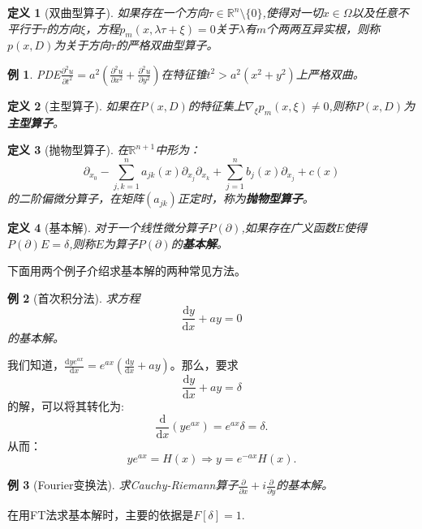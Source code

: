 \documentclass[a4paper]{ctexart}
\newtheorem{Definition}{\hspace{2em}定义}[section]
\newtheorem{Example}{\hspace{2em}例}[section]
\newcommand{\Rn}{\mathbb{R}^{n}}
\newcommand{\dif}{\mathrm{d}}
\newcommand{\difFrac}[2]{\frac{\dif #1}{\dif #2}}
\newcommand{\pdfFrac}[2]{\frac{\partial #1}{\partial #2}}
\begin{document}
\begin{Definition}[双曲型算子]
    如果存在一个方向$\tau\in\Rn\setminus\{0\}$,使得对一切$x\in\Omega$以及任意不平行于$\tau$的方向$\xi$，方程$p_{m}(x,\lambda\tau+\xi)=0$关于$\lambda$有$m$个两两互异实根，则称$p(x,D)$为关于方向$\tau$的严格双曲型算子。
\end{Definition}
\begin{Example}
    PDE$\pdfFrac{^2u}{t^2}=a^2(\pdfFrac{^2u}{x^2}+\pdfFrac{^2u}{y^2})$在特征锥$t^2>a^2(x^2+y^2)$上严格双曲。
\end{Example}
\begin{Definition}[主型算子]
    如果在$P(x,D)$的特征集上$\nabla_{\xi}p_{m}(x,\xi)\neq 0$,则称$P(x,D)$为\textbf{主型算子}。
\end{Definition}
\begin{Definition}[抛物型算子]
    在$\mathbb{R}^{n+1}$中形为：
    \begin{equation}
        \partial_{x_{0}}-\sum_{j,k=1}^{n}a_{jk}(x)\partial_{x_{j}}\partial_{x_{k}}+\sum_{j=1}^{n}b_{j}(x)\partial_{x_{j}}+c(x)
    \end{equation}
    的二阶偏微分算子，在矩阵$(a_{jk})$正定时，称为\textbf{抛物型算子}。
\end{Definition}

\begin{Definition}[基本解]
    对于一个线性微分算子$P(\partial)$,如果存在广义函数$E$使得$P(\partial)E=\delta$,则称$E$为算子$P(\partial)$的\textbf{基本解}。
\end{Definition}
下面用两个例子介绍求基本解的两种常见方法。
\begin{Example}[首次积分法]
    求方程
    \begin{equation}
        \difFrac{y}{x}+ay=0
    \end{equation}
    的基本解。
\end{Example}
我们知道，$\difFrac{ye^{ax}}{x}=e^{ax}(\difFrac{y}{x}+ay)$。那么，要求
\begin{equation}
    \difFrac{y}{x}+ay=\delta
\end{equation}
的解，可以将其转化为:
\begin{equation}
    \difFrac{}{x}(ye^{ax})=e^{ax}\delta=\delta.
\end{equation}
从而：
\begin{equation}
    ye^{ax}=H(x)\Rightarrow y=e^{-ax}H(x).
\end{equation}
\begin{Example}[Fourier变换法]
    求Cauchy-Riemann算子$\pdfFrac{}{x}+i\pdfFrac{}{y}$的基本解。
\end{Example}
在用FT法求基本解时，主要的依据是$F[\delta]=1$.
\end{document}
